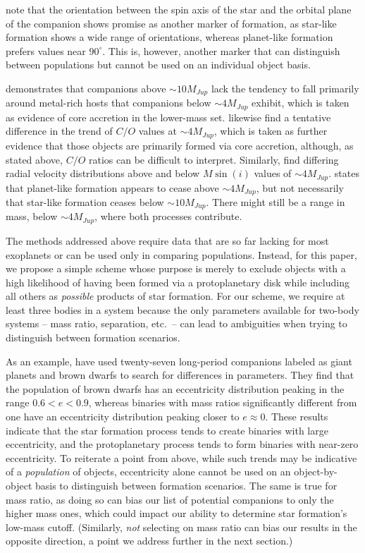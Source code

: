 \documentclass[twocolumn,tighten,twocolappendix]{aastex631}
\begin{document}
\cite{bowler2023} note that the orientation between the spin axis of the star and the orbital plane of the companion shows promise as another marker of formation, as star-like formation shows a wide range of orientations, whereas planet-like formation prefers values near $90^\circ$. This is, however, another marker that can distinguish between populations but cannot be used on an individual object basis.

\cite{schlaufman2018} demonstrates that companions above $\sim10 M_{Jup}$ lack the tendency to fall primarily around metal-rich hosts that companions below $\sim4 M_{Jup}$ exhibit, which is taken as evidence of core accretion in the lower-mass set. \cite{hoch2023} likewise find a tentative difference in the trend of $C/O$ values at $\sim4 M_{Jup}$, which is taken as further evidence that those objects are primarily formed via core accretion, although, as stated above, $C/O$ ratios can be difficult to interpret.  Similarly, \cite{ribas2007} find differing radial velocity distributions above and below $M \sin(i)$ values of $\sim4 M_{Jup}$. \cite{schlaufman2018} states that planet-like formation appears to cease above $\sim4 M_{Jup}$, but not necessarily that star-like formation ceases below $\sim10 M_{Jup}$. There might still be a range in mass, below $\sim4 M_{Jup}$, where both processes contribute.

The methods addressed above require data that are so far lacking for most exoplanets or can be used only in comparing populations. Instead, for this paper, we propose a simple scheme whose purpose is merely to exclude objects with a high likelihood of having been formed via a protoplanetary disk while including all others as {\it possible} products of star formation. For our scheme, we require at least three bodies in a system because the only parameters available for two-body systems -- mass ratio, separation, etc.\ -- can lead to ambiguities when trying to distinguish between formation scenarios. 

As an example, \cite{bowler2020} have used twenty-seven long-period companions labeled as giant planets and brown dwarfs to search for differences in parameters. They find that the population of brown dwarfs has an eccentricity distribution peaking in the range $0.6 < e < 0.9$, whereas binaries with mass ratios significantly different from one have an eccentricity distribution peaking closer to $e \approx 0$. These results indicate that the star formation process tends to create binaries with large eccentricity, and the protoplanetary process tends to form binaries with near-zero eccentricity. To reiterate a point from above, while such trends may be indicative of a {\it population} of objects, eccentricity alone cannot be used on an object-by-object basis to distinguish between formation scenarios. The same is true for mass ratio, as doing so can bias our list of potential companions to only the higher mass ones, which could impact our ability to determine star formation's low-mass cutoff. (Similarly, {\it not} selecting on mass ratio can bias our results in the opposite direction, a point we address further in the next section.)
\end{document}
